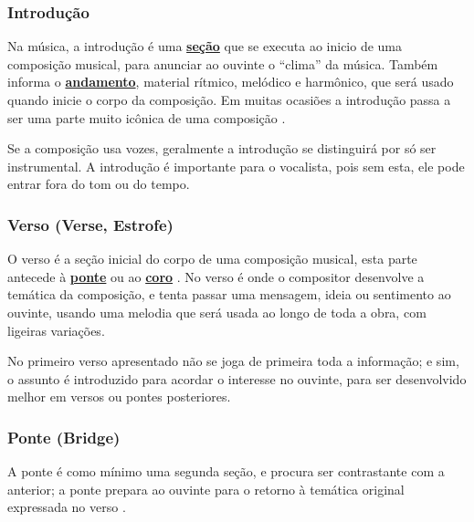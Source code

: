 \subsubsection{Introdução}
\label{ref:Introducao}
Na música, a introdução  é uma \hyperref[ref:Secao]{\textbf{seção}} que se executa ao inicio de uma composição musical,
para anunciar ao ouvinte o ``clima'' da música. Também informa o \hyperref[sec:Andamento]{\textbf{andamento}},
 material rítmico, 
melódico e harmônico, que será usado quando inicie o corpo da composição.
Em muitas ocasiões a introdução passa a ser uma parte muito icônica de uma composição
\cite[pp. 17]{adolfo1997composicao}.

Se a composição usa vozes,  geralmente a introdução se distinguirá por só ser instrumental. 
A introdução é importante para o vocalista, pois sem esta, ele pode entrar fora do tom ou do tempo. 

\subsubsection{Verso (Verse, Estrofe)}
\label{ref:Verse}
O verso é a seção inicial do corpo de uma composição musical, 
esta parte antecede à \hyperref[ref:Ponte]{\textbf{ponte}} ou ao \hyperref[ref:Coro]{\textbf{coro}}
\cite[pp. 18]{adolfo1997composicao}.
No verso é onde o compositor desenvolve a temática da composição,
e tenta passar uma mensagem, ideia ou sentimento ao ouvinte,
usando uma melodia que será usada ao longo de toda a obra, com ligeiras variações.

No primeiro verso apresentado não se joga de primeira toda a informação;
e sim, o assunto é introduzido para acordar o interesse no ouvinte,
para ser desenvolvido melhor em versos ou pontes posteriores.   

\subsubsection{Ponte (Bridge)}
\label{ref:Ponte}

A ponte é como mínimo uma segunda seção, e procura ser contrastante com a anterior; 
a ponte prepara ao ouvinte para o retorno à temática original expressada no verso 
\cite[pp. 18]{adolfo1997composicao}.

